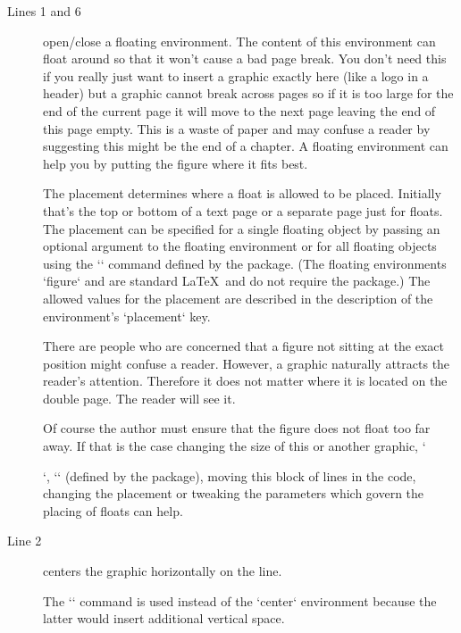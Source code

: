 \begin{description}
\item[Lines 1 and 6]
  open\slash close a floating environment.
  The content of this environment can float around so that it won't cause a bad page break.
  You don't need this if you really just want to insert a graphic exactly here (like a logo in a header)
  but a graphic cannot break across pages so if it is too large for the end of the current page it will move to the next page leaving the end of this page empty.
  This is a waste of paper and may confuse a reader by suggesting this might be the end of a chapter.
  A floating environment can help you by putting the figure where it fits best.

  The placement determines where a float is allowed to be placed.
  Initially that's the top or bottom of a text page or a separate page just for floats.
  The placement can be specified for a single floating object by passing an optional argument to the floating environment
  or for all floating objects using the `\floatplacement` command defined by the  package.
  (The floating environments `figure` and  are standard \LaTeX\ and do not require the  package.)
  The allowed values for the placement are described in the description of the  environment's `placement` key.

  There are people who are concerned that a figure not sitting at the exact position might confuse a reader.
  However, a graphic naturally attracts the reader's attention.
  Therefore it does not matter where it is located on the double page.
  The reader will see it.

  Of course the author must ensure that the figure does not float too far away.
  If that is the case changing the size of this or another graphic,
  `\usepackage[section]{placeins}`,
  `\FloatBarrier` (defined by the  package),
  moving this block of lines in the code,
  changing the placement or
  tweaking the parameters which govern the placing of floats \autocite[page~28]{latex2e}
  can help.

\item[Line 2]
  centers the graphic horizontally on the line.

  The `\centering` command is used instead of the `center` environment because the latter would insert additional vertical space.


\end{description}
